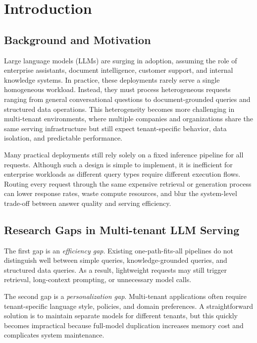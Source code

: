 \section{Introduction}

\subsection{Background and Motivation}

\noindent Large language models (LLMs) are surging in adoption, assuming the role of enterprise assistants, document intelligence, customer support, and internal knowledge systems. In practice, these deployments rarely serve a single homogeneous workload. Instead, they must process heterogeneous requests ranging from general conversational questions to document-grounded queries and structured data operations. This heterogeneity becomes more challenging in multi-tenant environments, where multiple companies and organizations share the same serving infrastructure but still expect tenant-specific behavior, data isolation, and predictable performance.

Many practical deployments still rely solely on a fixed inference pipeline for all requests. Although such a design is simple to implement, it is inefficient for enterprise workloads as different query types require different execution flows. Routing every request through the same expensive retrieval or generation process can lower response rates, waste compute resources, and blur the system-level trade-off between answer quality and serving efficiency.

\subsection{Research Gaps in Multi-tenant LLM Serving}

The first gap is an \textit{efficiency gap}. Existing one-path-fits-all pipelines do not distinguish well between simple queries, knowledge-grounded queries, and structured data queries. As a result, lightweight requests may still trigger retrieval, long-context prompting, or unnecessary model calls.

The second gap is a \textit{personalization gap}. Multi-tenant applications often require tenant-specific language style, policies, and domain preferences. A straightforward solution is to maintain separate models for different tenants, but this quickly becomes impractical because full-model duplication increases memory cost and complicates system maintenance.

